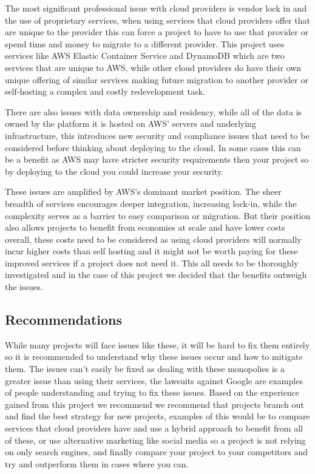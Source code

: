 \documentclass[]{project_report}
\begin{document}
The most significant professional issue with cloud providers is vendor lock in and the use of proprietary services, when using services that cloud providers offer that are unique to the provider this can force a project to have to use that provider or spend time and money to migrate to a different provider. This project uses services like AWS Elastic Container Service and DynamoDB which are two services that are unique to AWS, while other cloud providers do have their own unique offering of similar services making future migration to another provider or self-hosting a complex and costly redevelopment task.

There are also issues with data ownership and residency, while all of the data is owned by the platform it is hosted on AWS’ servers and underlying infrastructure, this introduces new security and compliance issues that need to be considered before thinking about deploying to the cloud. In some cases this can be a benefit as AWS may have stricter security requirements then your project so by deploying to the cloud you could increase your security.

These issues are amplified by AWS's dominant market position. The sheer breadth of services encourages deeper integration, increasing lock-in, while the complexity serves as a barrier to easy comparison or migration. But their position also allows projects to benefit from economies at scale and have lower costs overall, these costs need to be considered as using cloud providers will normally incur higher costs than self hosting and it might not be worth paying for these improved services if a project does not need it. This all needs to be thoroughly investigated and in the case of this project we decided that the benefits outweigh the issues. 

\subsection{Recommendations}

While many projects will face issues like these, it will be hard to fix them entirely so it is recommended to understand why these issues occur and how to mitigate them. The issues can’t easily be fixed as dealing with these monopolies is a greater issue than using their services, the lawsuits against Google are examples of people understanding and trying to fix these issues. Based on the experience gained from this project we recommend we recommend that projects branch out and find the best strategy for new projects, examples of this would be to compare services that cloud providers have and use a hybrid approach to benefit from all of these, or use alternative marketing like social media so a project is not relying on only search engines, and finally compare your project to your competitors and try and outperform them in cases where you can.
\end{document}
